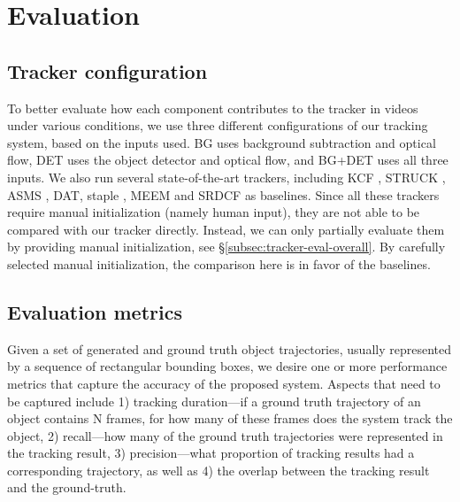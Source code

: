 \section{Evaluation} 
\label{sec:tracker-eval}

\subsection{Tracker configuration}

To better evaluate how each component contributes to the tracker in videos under various conditions, we use three different configurations of our tracking system, based on the inputs used. BG uses background subtraction and optical flow, DET uses the object detector and optical flow, and BG+DET uses all three inputs. 
We also run several state-of-the-art trackers, including KCF \cite{henriques2015high}, STRUCK \cite{hare2011struck}, ASMS \cite{vojir2014robust}, DAT\cite{possegger2015defense}, staple \cite{bertinetto2016staple}, MEEM \cite{zhang2014meem} and SRDCF \cite{danelljan2015learning} as baselines. 
Since all these trackers require manual initialization (namely human input), they are not able to be compared with our tracker directly. Instead, we can only partially evaluate them by providing manual initialization, see \S\ref{subsec:tracker-eval-overall}. By carefully selected manual initialization, the comparison here is in favor of the baselines.

\subsection{Evaluation metrics}

Given a set of generated and ground truth object trajectories, usually represented by a sequence of rectangular bounding boxes, we desire one or more performance metrics that capture the accuracy of the proposed system. Aspects that need to be captured include 1) tracking duration---if a ground truth trajectory of an object contains N frames, for how many of these frames does the system track the object, 2) recall---how many of the ground truth trajectories were represented in the tracking result, 3) precision---what proportion of tracking results had a corresponding trajectory, as well as 4) the overlap between the tracking result and the ground-truth.

